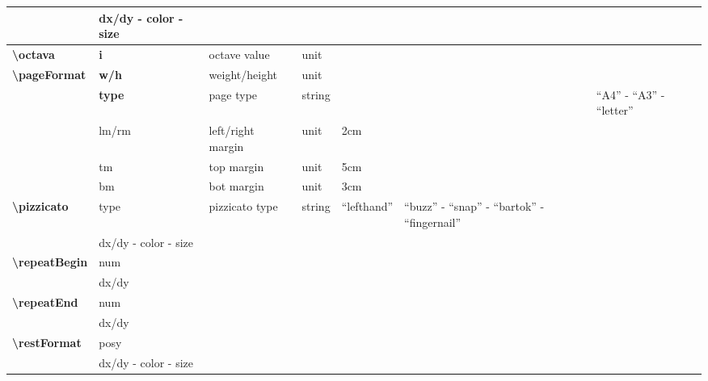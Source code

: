 \documentclass[a4paper, landscape, 10pt]{article}
\begin{document}
\begin{tabularx}{\linewidth}{p{3cm}p{3cm}p{5cm}p{3cm}p{2.5cm}p{3.5cm}p{4cm}}
	&dx/dy - color - size&&&&&\\
    \hline
    \textbf{\textbackslash{}octava}&\textbf{i}&octave value&unit&&&\\
    \hline
    \textbf{\textbackslash{}pageFormat}&\textbf{w/h}&weight/height&unit&&&\\
    &\textbf{type}&page type&string&&&``A4'' - ``A3'' - ``letter''\\
    &lm/rm&left/right margin&unit&2cm&&\\
    &tm&top margin&unit&5cm&&\\
    &bm&bot margin&unit&3cm&&\\
    \hline
    \textbf{\textbackslash{}pizzicato}&type&pizzicato type&string&``lefthand''&``buzz'' - ``snap'' - ``bartok'' - ``fingernail''&\\
    &dx/dy - color - size&&&&&\\
    \hline
    \textbf{\textbackslash{}repeatBegin}&num&&&&&\\ %
    &dx/dy&&&&&\\
    \hline
    \textbf{\textbackslash{}repeatEnd}&num&&&&&\\ %
    &dx/dy&&&&&\\
    \hline
    \textbf{\textbackslash{}restFormat}&posy&&&&&\\ %
    &dx/dy - color - size&&&&&\\
    \hline
\end{tabularx}
\end{document}
